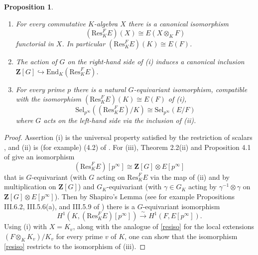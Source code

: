 \documentclass[reqno]{amsart}
\newtheorem{prop}[thm]{Proposition}
\theoremstyle{definition}
\def\Z{\mathbf{Z}}
\def\Res{\mathrm{Res}}
\def\End{\mathrm{End}}
\def\Sel{\mathrm{Sel}}
\def\isom{\xrightarrow{\sim}}
\def\hookto{\hookrightarrow}
\def\alg{X}
\begin{document}
\begin{prop}
\label{newresprop}
\begin{enumerate}
\item
For every commutative $K$-algebra $\alg$ there is a 
canonical isomorphism 
$$
(\Res^F_K E)(\alg) \cong E(\alg \otimes_K F)
$$
functorial in $\alg$.  In particular $(\Res^F_K E)(K) \cong E(F)$.
\item
The action of $G$ on the right-hand side of (i) induces a canonical 
inclusion $\Z[G] \hookto \End_K(\Res^F_K E)$.
\item
For every prime $p$ there is a natural $G$-equivariant isomorphism, 
compatible with the isomorphism $(\Res^F_K E)(K) \cong E(F)$ of (i),
$$
\Sel_{p^\infty}((\Res^F_K E)/K) \cong \Sel_{p^\infty}(E/F)
$$
where $G$ acts on the left-hand side via the inclusion of (ii). 
\end{enumerate}
\end{prop}

\begin{proof}
Assertion (i) is the universal property satisfied by the restriction 
of scalars \cite{weil}, and (ii) is (for example) (4.2) of \cite{prim}.  
For (iii), Theorem 2.2(ii) and Proposition 4.1 of \cite{prim} give an isomorphism  
$$
(\Res^F_K E)[p^\infty] \cong \Z[G] \otimes E[p^\infty]
$$ 
that is $G$-equivariant (with $G$ acting on $\Res^F_K E$ via the map of (ii) 
and by multiplication on $\Z[G]$) and $G_K$-equivariant 
(with $\gamma \in G_K$ acting by 
$\gamma^{-1} \otimes \gamma$ on $\Z[G] \otimes E[p^\infty]$).
Then by Shapiro's Lemma 
(see for example Propositions III.6.2, III.5.6(a), and III.5.9 of \cite{brown}) 
there is a $G$-equivariant isomorphism
\begin{equation}
\label{resiso}
H^1(K,(\Res^F_K E)[p^\infty]) \isom H^1(F,E[p^\infty]).
\end{equation}
Using (i) with $\alg = K_v$, along with the analogue of \eqref{resiso}
for the local extensions $(F \otimes_K K_v)/K_v$ for every 
prime $v$ of $K$, one can show that the isomorphism \eqref{resiso} restricts
to the isomorphism of (iii).
\end{proof}
\end{document}
